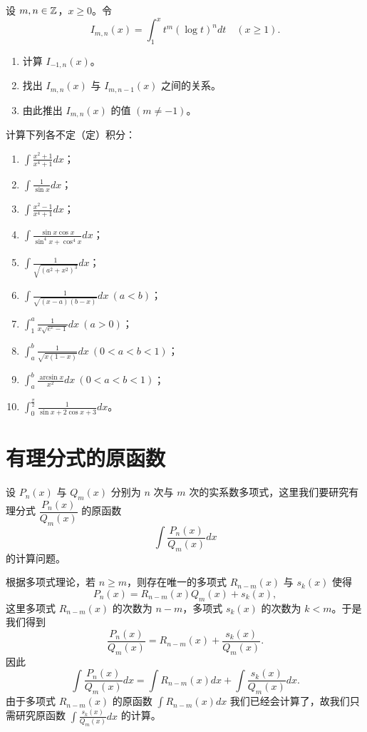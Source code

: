 \begin{exercise}
	\item 设 \(m,n\in\mathbb{Z}\)，\(x\ge0\)。令
	\[
	I_{m,n}(x)=\int_1^x t^m(\log t)^n dt\quad(x\ge1).
	\]
	\begin{enumerate}[label=\arabic*)]
		\item 计算 \(I_{-1,n}(x)\)。
		\item 找出 \(I_{m,n}(x)\) 与 \(I_{m,n-1}(x)\) 之间的关系。
		\item 由此推出 \(I_{m,n}(x)\) 的值 \((m\neq-1)\)。
	\end{enumerate}
\end{exercise}

\begin{exercise}
	\item 计算下列各不定（定）积分：
	\begin{enumerate}[label=\arabic*)]
		\item \(\displaystyle\int\frac{x^2+1}{x^4+1}dx\)；
		\item \(\displaystyle\int\frac1{\sin x}dx\)；
		\item \(\displaystyle\int\frac{x^2-1}{x^4+1}dx\)；
		\item \(\displaystyle\int\frac{\sin x\cos x}{\sin^4x+\cos^4x}dx\)；
		\item \(\displaystyle\int\frac1{\sqrt{(a^2+x^2)^3}}dx\)；
		\item \(\displaystyle\int\frac1{\sqrt{(x-a)(b-x)}}dx\ (a<b)\)；
		\item \(\displaystyle\int_1^a\frac1{x\sqrt{e^x-1}}dx\ (a>0)\)；
		\item \(\displaystyle\int_a^b\frac1{\sqrt{x(1-x)}}dx\ (0<a<b<1)\)；
		\item \(\displaystyle\int_a^b\frac{\arcsin x}{x^2}dx\ (0<a<b<1)\)；
		\item \(\displaystyle\int_0^{\frac\pi2}\frac1{\sin x+2\cos x+3}dx\)。
	\end{enumerate}
\end{exercise}

\section{有理分式的原函数}

设 \(P_n(x)\) 与 \(Q_m(x)\) 分别为 \(n\) 次与 \(m\) 次的实系数多项式，这里我们要研究有理分式 \(\dfrac{P_n(x)}{Q_m(x)}\) 的原函数
\[
\int\frac{P_n(x)}{Q_m(x)}dx
\]
的计算问题。

根据多项式理论，若 \(n\ge m\)，则存在唯一的多项式 \(R_{n-m}(x)\) 与 \(s_k(x)\) 使得
\[
P_n(x)=R_{n-m}(x)Q_m(x)+s_k(x),
\]
这里多项式 \(R_{n-m}(x)\) 的次数为 \(n-m\)，多项式 \(s_k(x)\) 的次数为 \(k<m\)。于是我们得到
\[
\frac{P_n(x)}{Q_m(x)}=R_{n-m}(x)+\frac{s_k(x)}{Q_m(x)}.
\]
因此
\[
\int\frac{P_n(x)}{Q_m(x)}dx=\int R_{n-m}(x)dx+\int\frac{s_k(x)}{Q_m(x)}dx.
\]
由于多项式 \(R_{n-m}(x)\) 的原函数 \(\displaystyle\int R_{n-m}(x)dx\) 我们已经会计算了，故我们只需研究原函数 \(\displaystyle\int\frac{s_k(x)}{Q_m(x)}dx\) 的计算。

